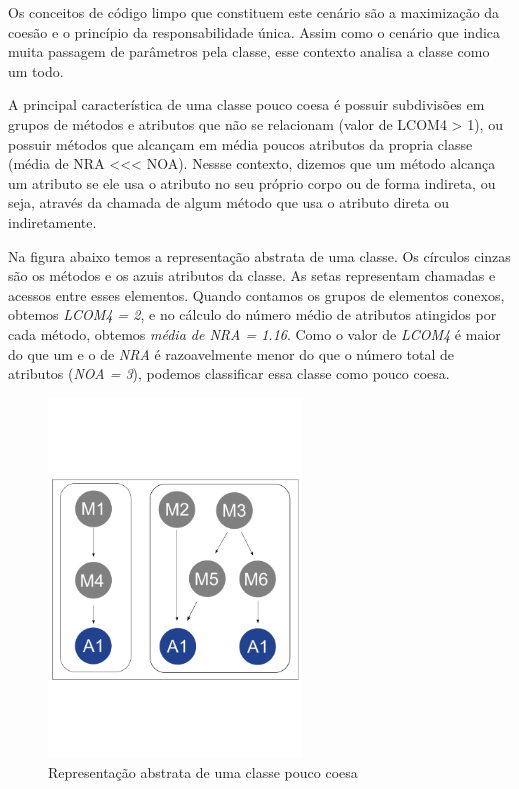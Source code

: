 Os conceitos de código limpo que constituem este cenário são a maximização da coesão e o princípio da responsabilidade única. Assim como o cenário que indica muita passagem de parâmetros pela classe, esse contexto analisa a classe como um todo.
	
A principal característica de uma classe pouco coesa é possuir subdivisões em grupos de métodos e atributos que não se relacionam (valor de LCOM4 > 1), ou possuir métodos que alcançam em média poucos atributos da propria classe (média de NRA <<< NOA). Nessse contexto, dizemos que um método alcança um atributo se ele usa o atributo no seu próprio corpo ou de forma indireta, ou seja, através da chamada de algum método que usa o atributo direta ou indiretamente.
	   
Na figura abaixo temos a representação abstrata de uma classe. Os círculos cinzas são os métodos e os azuis atributos da classe. As setas representam chamadas e acessos entre esses elementos. Quando contamos os grupos de elementos conexos, obtemos \textit{LCOM4 = 2}, e no cálculo do número médio de atributos atingidos por cada método, obtemos \textit{média de NRA = 1.16}. Como o valor de \textit{LCOM4} é maior do que um e o de \textit{NRA} é razoavelmente menor do que o número total de atributos (\textit{NOA = 3}), podemos classificar essa classe como pouco coesa.                  
		
\begin{figure}[htb]
	\centering
	\includegraphics[trim = 0mm 50mm 0mm 60mm, clip, width=0.6\textwidth]{codigos/exemplos_para_os_cenarios/classe_pouco_coesa.png}
	\caption{Representação abstrata de uma classe pouco coesa}
	\label{classe_pouco_coesa}
\end{figure}
	
